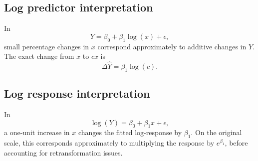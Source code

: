 \subsection*{Log predictor interpretation}

In
\begin{equation}
  Y=\beta_0+\beta_1\log(x)+\epsilon,
\end{equation}
small percentage changes in \(x\) correspond approximately to additive changes in \(Y\).  The exact change from \(x\) to \(cx\) is
\begin{equation}
  \Delta \widehat{Y}=\beta_1\log(c).
\end{equation}

\subsection*{Log response interpretation}

In
\begin{equation}
  \log(Y)=\beta_0+\beta_1x+\epsilon,
\end{equation}
a one-unit increase in \(x\) changes the fitted log-response by \(\beta_1\).  On the original scale, this corresponds approximately to multiplying the response by \(e^{\beta_1}\), before accounting for retransformation issues.

